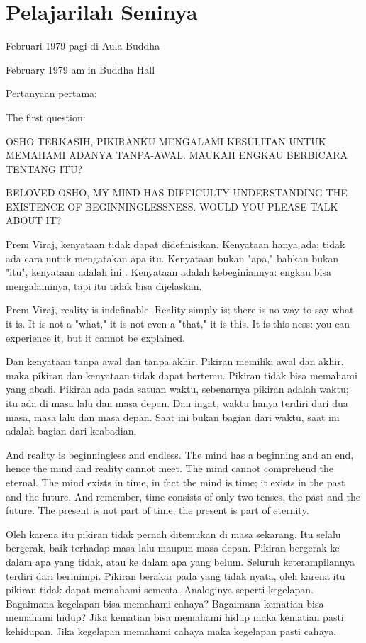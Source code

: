 \chapter{Pelajarilah Seninya} %

 Februari 1979 pagi di Aula Buddha

 February 1979 am in Buddha Hall

\bahasa
Pertanyaan pertama:

\english
The first question:

\bahasa
OSHO TERKASIH,
PIKIRANKU MENGALAMI KESULITAN UNTUK MEMAHAMI ADANYA TANPA-AWAL. MAUKAH ENGKAU BERBICARA TENTANG ITU?

\english
BELOVED OSHO,
MY MIND HAS DIFFICULTY UNDERSTANDING THE EXISTENCE OF BEGINNINGLESSNESS. WOULD YOU PLEASE TALK ABOUT IT?

\bahasa
Prem Viraj, kenyataan tidak dapat didefinisikan. Kenyataan hanya ada; tidak ada cara untuk mengatakan apa itu. Kenyataan bukan "apa," bahkan bukan "itu", kenyataan adalah ini . Kenyataan adalah kebeginiannya: engkau bisa mengalaminya, tapi itu tidak bisa dijelaskan.

\english
Prem Viraj, reality is indefinable. Reality simply is; there is no way to say what it is. It is not a "what," it is not even a "that," it is this. It is this-ness: you can experience it, but it cannot be explained.

\bahasa
Dan kenyataan tanpa awal dan tanpa akhir. Pikiran memiliki awal dan akhir, maka pikiran dan kenyataan tidak dapat bertemu. Pikiran tidak bisa memahami yang abadi. Pikiran ada pada satuan waktu, sebenarnya pikiran adalah waktu; itu ada di masa lalu dan masa depan. Dan ingat, waktu hanya terdiri dari dua masa, masa lalu dan masa depan. Saat ini bukan bagian dari waktu, saat ini adalah bagian dari keabadian.

\english
And reality is beginningless and endless. The mind has a beginning and an end, hence the mind and reality cannot meet. The mind cannot comprehend the eternal. The mind exists in time, in fact the mind is time; it exists in the past and the future. And remember, time consists of only two tenses, the past and the future. The present is not part of time, the present is part of eternity.

\bahasa
Oleh karena itu pikiran tidak pernah ditemukan di masa sekarang. Itu selalu bergerak, baik terhadap masa lalu maupun masa depan. Pikiran bergerak ke dalam apa yang tidak, atau ke dalam apa yang belum. Seluruh keterampilannya terdiri dari bermimpi. Pikiran berakar pada yang tidak nyata, oleh karena itu pikiran tidak dapat memahami semesta. Analoginya seperti kegelapan. Bagaimana kegelapan bisa memahami cahaya? Bagaimana kematian bisa memahami hidup? Jika kematian bisa memahami hidup maka kematian pasti kehidupan. Jika kegelapan memahami cahaya maka kegelapan pasti cahaya.


